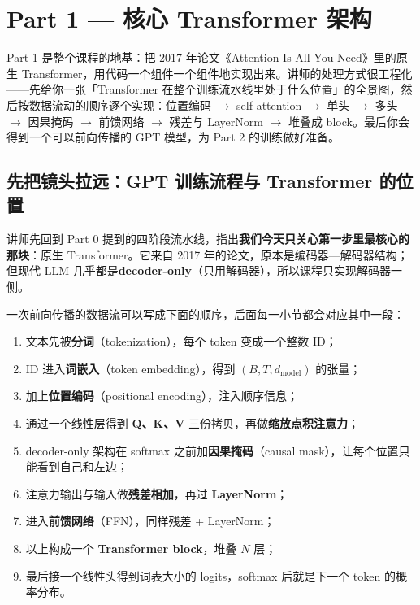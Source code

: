 \section{Part 1 — 核心 Transformer 架构}

Part 1 是整个课程的地基：把 2017 年论文《Attention Is All You Need》里的原生 Transformer，用代码一个组件一个组件地实现出来。讲师的处理方式很工程化——先给你一张「Transformer 在整个训练流水线里处于什么位置」的全景图，然后按数据流动的顺序逐个实现：位置编码 $\rightarrow$ self-attention $\rightarrow$ 单头 $\rightarrow$ 多头 $\rightarrow$ 因果掩码 $\rightarrow$ 前馈网络 $\rightarrow$ 残差与 LayerNorm $\rightarrow$ 堆叠成 block。最后你会得到一个可以前向传播的 GPT 模型，为 Part 2 的训练做好准备。

\subsection{先把镜头拉远：GPT 训练流程与 Transformer 的位置}

讲师先回到 Part 0 提到的四阶段流水线，指出\textbf{我们今天只关心第一步里最核心的那块}：原生 Transformer。它来自 2017 年的论文，原本是编码器—解码器结构；但现代 LLM 几乎都是\textbf{decoder-only}（只用解码器），所以课程只实现解码器一侧。

一次前向传播的数据流可以写成下面的顺序，后面每一小节都会对应其中一段：

\begin{enumerate}
\item 文本先被\textbf{分词}（tokenization），每个 token 变成一个整数 ID；
\item ID 进入\textbf{词嵌入}（token embedding），得到 $(B,T,d_{\text{model}})$ 的张量；
\item 加上\textbf{位置编码}（positional encoding），注入顺序信息；
\item 通过一个线性层得到 \textbf{Q、K、V} 三份拷贝，再做\textbf{缩放点积注意力}；
\item decoder-only 架构在 softmax 之前加\textbf{因果掩码}（causal mask），让每个位置只能看到自己和左边；
\item 注意力输出与输入做\textbf{残差相加}，再过 \textbf{LayerNorm}；
\item 进入\textbf{前馈网络}（FFN），同样残差 + LayerNorm；
\item 以上构成一个 \textbf{Transformer block}，堆叠 $N$ 层；
\item 最后接一个线性头得到词表大小的 logits，softmax 后就是下一个 token 的概率分布。
\end{enumerate}

